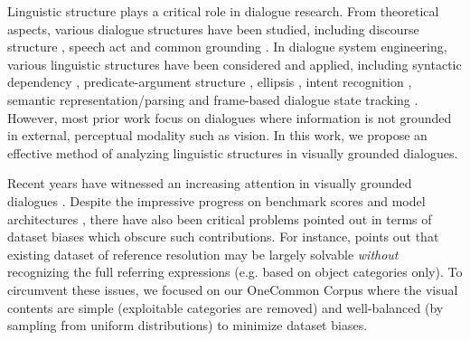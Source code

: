 Linguistic structure plays a critical role in dialogue research. From theoretical aspects, various dialogue structures have been studied, including discourse structure \citep{stent-2000-rhetorical,asher2003logics}, speech act \citep{austin1962things,searle1969speech} and common grounding \citep{clark1996using,lascarides2009agreement}. In dialogue system engineering, various linguistic structures have been considered and applied, including syntactic dependency \citep{davidson-etal-2019-dependency}, predicate-argument structure \citep{yoshino2011spoken}, ellipsis \citep{quan-etal-2019-gecor,hansen2020you}, intent recognition \citep{silva2011symbolic,shi-etal-2016-deep}, semantic representation/parsing \citep{mesnil2013investigation,gupta-etal-2018-semantic} and frame-based dialogue state tracking \citep{williams2016dialog,elasri2017frames}. However, most prior work focus on dialogues where information is not grounded in external, perceptual modality such as vision. In this work, we propose an effective method of analyzing linguistic structures in visually grounded dialogues.

Recent years have witnessed an increasing attention in visually grounded dialogues \citep{zarriess-etal-2016-pentoref,de2018talk,alamri2019audio,narayan-chen-etal-2019-collaborative}. Despite the impressive progress on benchmark scores and model architectures \citep{Das_2017_ICCV,Wu_2018_CVPR,Kottur_2018_ECCV,gan-etal-2019-multi,shukla-etal-2019-ask,niu2019recursive,zheng2019reasoning,kang-etal-2019-dual,visdial_bert,pang2020visual}, there have also been critical problems pointed out in terms of dataset biases \citep{goyal2017making,visdial_eval,massiceti2018visual,chen-etal-2018-attacking,kottur-etal-2019-clevr,kim2020modality,agarwal-etal-2020-history} which obscure such contributions. For instance, \citet{cirik-etal-2018-visual} points out that existing dataset of reference resolution may be largely solvable \textit{without} recognizing the full referring expressions (e.g. based on object categories only). To circumvent these issues, we focused on our OneCommon Corpus where the visual contents are simple (exploitable categories are removed) and well-balanced (by sampling from uniform distributions) to minimize dataset biases.

